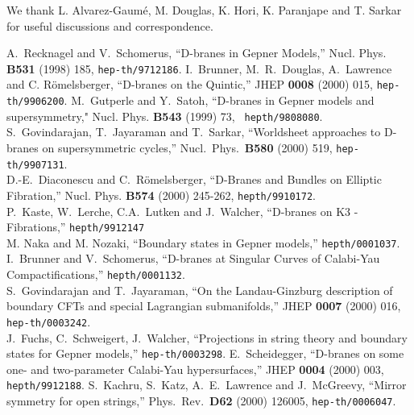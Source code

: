 \documentclass[a4paper,12pt]{article}
\begin{document}
 We thank L. Alvarez-Gaum\'e, M. Douglas,
K. Hori, K. Paranjape and T. Sarkar for useful discussions and
correspondence.



\begin{thebibliography}{99}
A.~Recknagel and V.~Schomerus, ``D-branes in Gepner Models,''
Nucl. Phys. {\bf B531} (1998) 185, {\tt hep-th/9712186}.
 I.~Brunner, M.~R.~Douglas, A.~Lawrence and C.
R\"omelsberger, ``D-branes on the Quintic,'' JHEP {\bf 0008} (2000) 015,
{\tt hep-th/9906200}.
M.~Gutperle and Y.~Satoh, ``D-branes in Gepner models
and supersymmetry," Nucl. Phys. {\bf B543} (1999) 73, {\tt
hepth/9808080}. \\
S.~Govindarajan, T.~Jayaraman and T.~Sarkar,
``Worldsheet approaches to D-branes on supersymmetric cycles,''
Nucl.\ Phys.\ {\bf B580} (2000) 519,
{\tt hep-th/9907131}. \\
D.-E.~Diaconescu and C.~R\"omelsberger,
``D-Branes and Bundles on Elliptic Fibration,'' Nucl. Phys. {\bf B574}
(2000)
245-262, {\tt hepth/9910172}.  \\
P.~Kaste, W.~Lerche, C.A.~Lutken and J.~Walcher, ``D-branes on K3 -
Fibrations,'' {\tt hepth/9912147} \\
M. Naka and M. Nozaki, ``Boundary states in Gep\-ner mod\-els,''
{\tt hepth/0001037}. \\
I.~Brunner and V.~Schomerus, ``D-branes at Singular Curves of
Calabi-Yau Compactifications,'' {\tt hepth/0001132}.\\
S.~Govindarajan and T.~Jayaraman,
``On the Landau-Ginzburg description of boundary CFTs and special
Lagrangian submanifolds,'' JHEP {\bf 0007} (2000) 016,
{\tt hep-th/0003242}. \\
J.~Fuchs, C.~Schweigert, J.~Walcher, ``Projections in string theory
and boundary states for Gepner models,'' {\tt hep-th/0003298}.
 E.~Scheidegger, ``D-branes on some one- and
two-parameter Calabi-Yau hypersurfaces,'' JHEP {\bf 0004} (2000) 003, 
{\tt hepth/9912188}.
S.~Kachru, S.~Katz, A.~E.~Lawrence and J.~McGreevy,
``Mirror symmetry for open strings,''
Phys.\ Rev.\  {\bf D62} (2000) 126005,
{\tt hep-th/0006047}. \\

\end{thebibliography}
\end{document}
